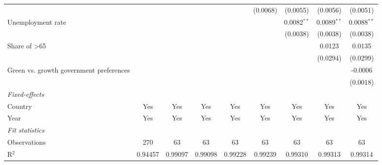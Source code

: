 \begin{table}[htbp]
\begin{tabular}{lcccccccc}
                                                                                       &          &          &          &              & (0.0068)      & (0.0055)      & (0.0056)      & (0.0051)\\   
      Unemployment rate                                                                &          &          &          &              &               & 0.0082$^{**}$ & 0.0089$^{**}$ & 0.0088$^{**}$\\   
                                                                                       &          &          &          &              &               & (0.0038)      & (0.0038)      & (0.0038)\\   
      Share of >65                                                                     &          &          &          &              &               &               & 0.0123        & 0.0135\\   
                                                                                       &          &          &          &              &               &               & (0.0294)      & (0.0299)\\   
      Green vs. growth government preferences                                          &          &          &          &              &               &               &               & -0.0006\\   
                                                                                       &          &          &          &              &               &               &               & (0.0018)\\   
      \midrule
      \emph{Fixed-effects}\\
      Country                                                                          & Yes      & Yes      & Yes      & Yes          & Yes           & Yes           & Yes           & Yes\\  
      Year                                                                             & Yes      & Yes      & Yes      & Yes          & Yes           & Yes           & Yes           & Yes\\  
      \midrule
      \emph{Fit statistics}\\
      Observations                                                                     & 270      & 63       & 63       & 63           & 63            & 63            & 63            & 63\\  
      R$^2$                                                                            & 0.94457  & 0.99097  & 0.99098  & 0.99228      & 0.99239       & 0.99310       & 0.99313       & 0.99314\\  

\end{tabular}
\end{table}
